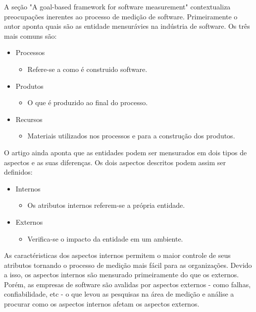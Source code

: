 A seção "A goal-based framework for software measurement" contextualiza preocupações inerentes ao processo de medição de software. Primeiramente o autor aponta quais são as entidade mensurávies na indústria de software. Os três mais comuns são:
\begin{itemize}
\item    Processos
        \begin{itemize}
        \item[] Refere-se a como é construido software.
        \end{itemize}
\item    Produtos
        \begin{itemize}
        \item[] O que é produzido ao final do processo.
        \end{itemize}
\item    Recursos
        \begin{itemize}
        \item[] Materiais utilizados nos processos e para a construção dos produtos.
        \end{itemize}
\end{itemize}

O artigo ainda aponta que as entidades podem ser mensurados em dois tipos de aspectos e as suas diferenças. Os dois aspectos descritos podem assim ser definidos:
\begin{itemize}
\item   Internos
        \begin{itemize}
        \item[] Os atributos internos referem-se a própria entidade.
        \end{itemize}
\item    Externos 
        \begin{itemize}
        \item[]  Verifica-se o impacto da entidade em um ambiente.
        \end{itemize}
\end{itemize}

As caractéristicas dos aspectos internos permitem o maior controle de seus atributos tornando o processo de medição mais fácil para as organizações. Devido a isso, os aspectos internos são mensurado primeiramente do que os externos. Porém, as empresas de software são avalidas por aspectos externos - como falhas, confiabilidade, etc - o que levou as pesquisas na área de medição e análise a procurar como os aspectos internos afetam os aspectos externos.  

